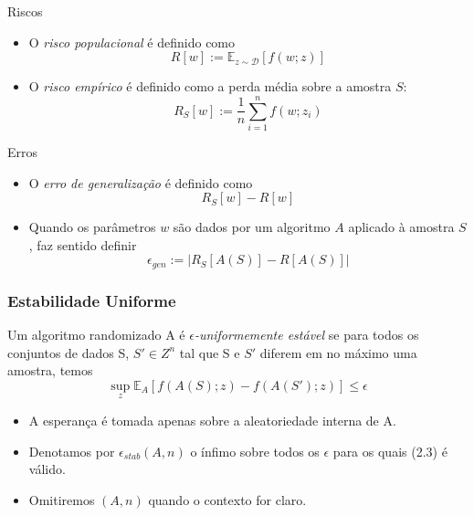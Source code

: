 \documentclass{beamer}
\newcommand{\EE}{\mathbb{E}}
\begin{document}
\begin{frame}{Riscos}
    \begin{itemize}
        \item O \emph{risco populacional} é definido como
        \begin{equation*}
            R[w] := \EE_{z\sim\mathcal{D}}[f(w;z)]
        \end{equation*}
        \item O \emph{risco empírico} é definido como a perda média sobre a amostra \(S\):
        \begin{equation*}
            R_{S}[w] := \frac{1}{n}\sum_{i=1}^{n}f(w;z_{i})
        \end{equation*}
    \end{itemize}
\end{frame}

\begin{frame}{Erros}
    \begin{itemize} 
    \item O \emph{erro de generalização} é definido como
         \begin{equation*}
            R_{S}[w] - R[w]
        \end{equation*}
        \item Quando os parâmetros $w$ são dados por um algoritmo $A$ aplicado à amostra $S$, faz sentido definir
        \begin{equation*}
            \epsilon_{gen}  := |R_{S}[A(S)] - R[A(S)]|
        \end{equation*}
    \end{itemize}
\end{frame}

\begin{frame}
\frametitle{Estabilidade Uniforme}
\begin{definition}[2.1]
Um algoritmo randomizado A é \emph{$\epsilon$-uniformemente estável} se para todos os conjuntos de dados S, \(S' \in Z^n\) tal que S e \(S'\) diferem em no máximo uma amostra, temos
\begin{equation*}
    \tag{2.3}
    \sup_{z} \EE_{A}[f(A(S);z) - f(A(S');z)] \le \epsilon 
\end{equation*}
\end{definition}
\small
\begin{itemize}
    \item A esperança é tomada apenas sobre a aleatoriedade interna de A.
    \item Denotamos por $\epsilon_{stab}(A,n)$ o ínfimo sobre todos os $\epsilon$ para os quais (2.3) é válido.
    \item Omitiremos $(A,n)$ quando o contexto for claro.
\end{itemize}
\end{frame}
\end{document}
